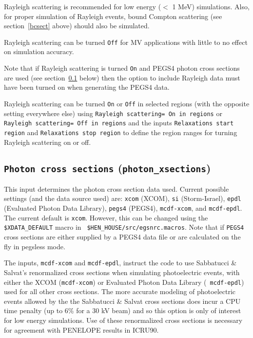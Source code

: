 \documentclass[12pt,twoside]{article}
\begin{document}
Rayleigh scattering is recommended for low energy ($<$ 1 MeV) simulations.
Also, for proper simulation of Rayleigh events, bound Compton scattering (see
section~\ref{bcsect} above) should also be simulated.

Rayleigh scattering can be turned {\tt Off} for MV applications with little to
no effect on simulation accuracy.

Note that if Rayleigh scattering is turned {\tt On} and PEGS4 photon cross
sections are used (see section~\ref{photxsectsect} below) then the option to
include Rayleigh data must have been turned on when generating the PEGS4 data.

Rayleigh scattering can be turned {\tt On} or {\tt Off} in selected regions
(with the opposite setting everywhere else) using
{\tt Rayleigh scattering= On in regions} or {\tt Rayleigh scattering= Off
in regions} and the inputs
{\tt Relaxations start region} and {\tt Relaxations stop region} to
define the region ranges for turning Rayleigh scattering on or off.

\subsection{{\tt Photon cross sections} ({\tt photon\_xsections})}
\label{photxsectsect}

This input determines the photon cross section data used. Current possible
settings (and the data source used) are: {\tt xcom} (XCOM), {\tt si}
(Storm-Israel), {\tt epdl} (Evaluated Photon Data Library), {\tt pegs4} (PEGS4),
{\tt mcdf-xcom}, and {\tt mcdf-epdl}.  The current default is {\tt xcom}.
However, this can be changed using the {\tt \$XDATA\_DEFAULT} macro in {\tt
\$HEN\_HOUSE/src/egsnrc.macros}. Note that if {\tt PEGS4} cross sections are
either supplied by a PEGS4 data file or are calculated on the fly in pegsless
mode.

 The
inputs, {\tt mcdf-xcom} and {\tt mcdf-epdl}, instruct the code to use Sabbatucci
\& Salvat's renormalized cross sections when simulating photoelectric events,
with either the XCOM ({\tt mcdf-xcom}) or Evaluated Photon Data Library ({\tt
mcdf-epdl}) used for all other cross sections.  The more accurate modeling of
photoelectric events allowed by the the Sabbatucci \& Salvat cross sections does
incur a CPU time penalty (up to 6\% for a 30 kV beam) and so this option is only
of interest for low energy simulations. Use of these renormalized cross sections
is necessary for agreement with PENELOPE results in ICRU90\cite{ICRU90}.
\end{document}
